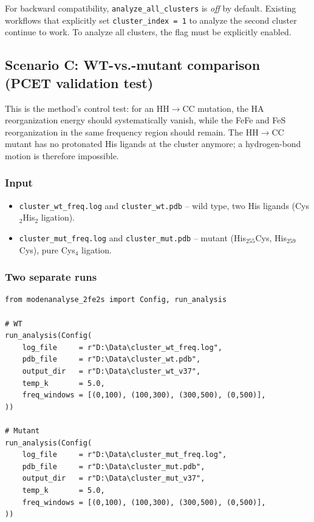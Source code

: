 \documentclass[11pt,a4paper,twoside]{article}
\theoremstyle{remark}
\begin{document}
For backward compatibility, \texttt{analyze\_all\_clusters} is
\emph{off} by default. Existing workflows that explicitly set
\texttt{cluster\_index = 1} to analyze the second cluster
continue to work. To analyze all clusters, the flag must be
explicitly enabled.

\subsection{Scenario C: WT-vs.-mutant comparison (PCET validation test)}
\label{sec:workflow-wtmut}

This is the method's control test: for an HH$\to$CC mutation, the
HA reorganization energy should systematically vanish, while the
FeFe and FeS reorganization in the same frequency region should
remain. The HH$\to$CC mutant has no protonated His ligands at the
cluster anymore; a hydrogen-bond motion is therefore impossible.

\subsubsection*{Input}

\begin{itemize}
  \item \texttt{cluster\_wt\_freq.log} and \texttt{cluster\_wt.pdb}
        -- wild type, two His ligands (Cys$_2$His$_2$ ligation).
  \item \texttt{cluster\_mut\_freq.log} and
        \texttt{cluster\_mut.pdb} -- mutant
        (His$_{255}$Cys, His$_{259}$Cys), pure Cys$_4$ ligation.
\end{itemize}

\subsubsection*{Two separate runs}

\begin{lstlisting}[style=python]
from modenanalyse_2fe2s import Config, run_analysis

# WT
run_analysis(Config(
    log_file     = r"D:\Data\cluster_wt_freq.log",
    pdb_file     = r"D:\Data\cluster_wt.pdb",
    output_dir   = r"D:\Data\cluster_wt_v37",
    temp_k       = 5.0,
    freq_windows = [(0,100), (100,300), (300,500), (0,500)],
))

# Mutant
run_analysis(Config(
    log_file     = r"D:\Data\cluster_mut_freq.log",
    pdb_file     = r"D:\Data\cluster_mut.pdb",
    output_dir   = r"D:\Data\cluster_mut_v37",
    temp_k       = 5.0,
    freq_windows = [(0,100), (100,300), (300,500), (0,500)],
))
\end{lstlisting}
\end{document}
